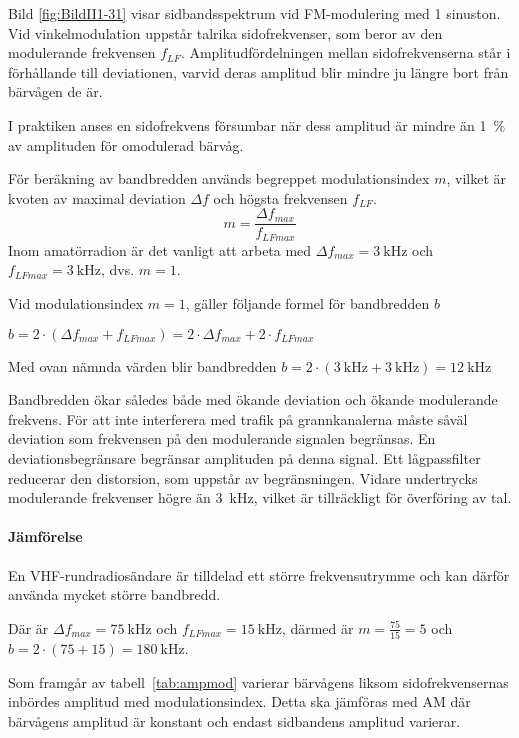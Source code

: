 Bild \ref{fig:BildII1-31} visar sidbandsspektrum vid FM-moduler\-ing med 1
sinuston.
Vid vinkelmodulation uppstår talrika sidofrekvenser, som beror av den
modulerande frekvensen \(f_{LF}\).
Amplitudfördelningen mellan sidofrekvenserna står i förhållande till
deviationen, varvid deras amplitud blir mindre ju längre bort från bärvågen
de är.

I praktiken anses en sidofrekvens försumbar när dess amplitud är mindre än 1~\%
av amplituden för omodulerad bärvåg.

För beräkning av bandbredden används begreppet modulationsindex \(m\), vilket är
kvoten av maximal deviation \(\Delta f\) och högsta frekvensen \(f_{LF}\).
\[m = \dfrac{\Delta f_{max}}{f_{LFmax}}\]
Inom amatörradion är det vanligt att arbeta med \(\Delta f_{max} =
\SI{3}{\kilo\hertz}\) och \(f_{LFmax} = \SI{3}{\kilo\hertz}\), dvs. \(m = 1\).

Vid modulationsindex \(m = 1\), gäller följande formel för bandbredden \(b\)

\medskip
\(b = 2 \cdot ( \Delta f_{max} + f_{LFmax}) = 2 \cdot \Delta f_{max}
 + 2 \cdot f_{LFmax}\)
 \medskip
 
Med ovan nämnda värden blir bandbredden \(b = 2 \cdot (\SI{3}{\kilo\hertz} +
\SI{3}{\kilo\hertz}) = \SI{12}{\kilo\hertz}\)

Bandbredden ökar således både med ökande deviation och ökande modulerande
frekvens.
För att inte interferera med trafik på grannkanalerna måste såväl deviation som
frekvensen på den modulerande signalen begränsas.
En deviationsbegränsare begränsar amplituden på denna signal.
Ett lågpassfilter reducerar den distorsion, som uppstår av begränsningen.
Vidare undertrycks modulerande frekvenser högre än \SI{3}{\kilo\hertz}, vilket
är tillräckligt för överföring av tal.

\paragraph{Jämförelse}

En VHF-rundradiosändare är tilldelad ett större frekvensutrymme och kan därför
använda mycket större bandbredd.

Där är \(\Delta f_{max} = \SI{75}{\kilo\hertz}\) och \(f_{LFmax} =
\SI{15}{\kilo\hertz}\), därmed är \(m = \frac{75}{15} = 5\) och \(b = 2 \cdot
(75 + 15) = \SI{180}{\kilo\hertz}\).

Som framgår av tabell~\ref{tab:ampmod} varierar bärvågens liksom
sidofrekvensernas inbördes amplitud med modulationsindex.
Detta ska jämföras med AM där bärvågens amplitud är konstant och endast
sidbandens amplitud varierar.

